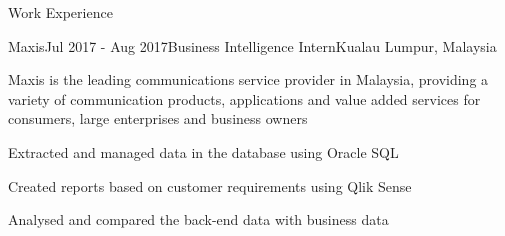 \documentclass{techresume} %
\begin{document}

\begin{rSection}{Work Experience}

\begin{rSubsection}{Maxis}{Jul 2017 - Aug 2017}{Business Intelligence Intern}{Kualau Lumpur, Malaysia}
\item Maxis is the leading communications service provider in Malaysia, providing a variety of communication products, applications and value added services for consumers, large enterprises and business owners
\item Extracted and managed data in the database using Oracle SQL
\item Created reports based on customer requirements using Qlik Sense
\item Analysed and compared the back-end data with business data
\end{rSubsection}

\end{rSection}

\end{document}
